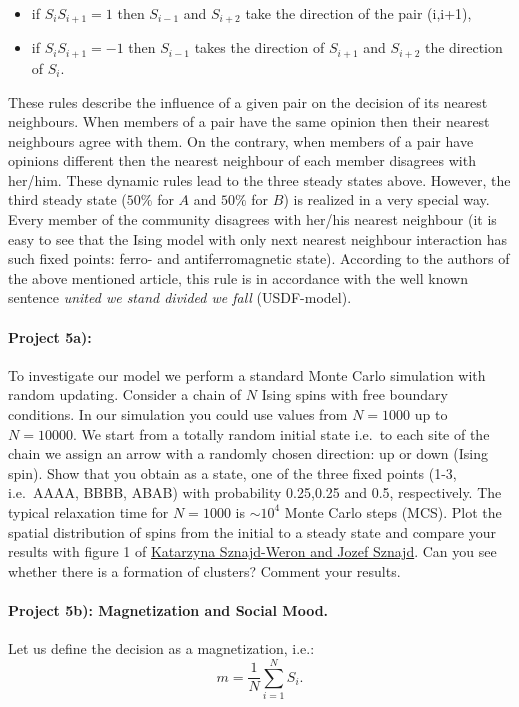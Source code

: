 \documentclass[%
oneside,                 %
final,                   %
10pt]{article}
\begin{document}
\begin{itemize}
\item if $S_iS_{i+1}=1$ then $S_{i-1}$ and $S_{i+2}$ take the direction of the pair (i,i+1),

\item if $S_iS_{i+1}=-1$ then $S_{i-1}$ takes the direction of $S_{i+1}$ and $S_{i+2}$ the direction of $S_i$. 
\end{itemize}

\noindent
These rules describe the influence of a given pair on the decision of
its nearest neighbours. When members of a pair have the same opinion
then their nearest neighbours agree with them. On the contrary, when
members of a pair have opinions different then the nearest neighbour
of each member disagrees with her/him.  These dynamic rules lead to
the three steady states above.  However, the third steady state ($50\%$
for $A$ and $50\%$ for $B$) is realized in a very special way.  Every
member of the community disagrees with her/his nearest neighbour (it
is easy to see that the Ising model with only next nearest neighbour
interaction has such fixed points: ferro- and antiferromagnetic
state).  According to the authors of the above mentioned article,
this rule is in accordance with the well known sentence
\emph{united we stand divided we fall} (USDF-model).


\paragraph{Project 5a):}
To investigate our model we perform a standard Monte Carlo simulation
with random updating.  Consider a chain of $N$ Ising spins with free
boundary conditions. In our simulation you could use values from
$N=1000$ up to $N=10000$. We start from a totally random initial state
i.e.~to each site of the chain we assign an arrow with a randomly
chosen direction: up or down (Ising spin).  Show that you obtain as a
state, one of the three fixed points (1-3, i.e.~AAAA, BBBB, ABAB) with
probability 0.25,0.25 and 0.5, respectively. The typical relaxation
time for $N=1000$ is $\sim 10^4$ Monte Carlo steps (MCS). Plot the
spatial distribution of spins from the initial to a steady state and
compare your results with figure 1 of \href{{https://arxiv.org/abs/cond-mat/0101130}}{Katarzyna Sznajd-Weron and
Jozef Sznajd}. Can you see
whether there is a formation of clusters?  Comment your results.


\paragraph{Project 5b): Magnetization and Social Mood.}
Let us define the decision as a magnetization, i.e.:
\begin{equation}
m=\frac{1}{N}\sum_{i=1}^N S_i.
\label{em}
\end{equation}
\end{document}

